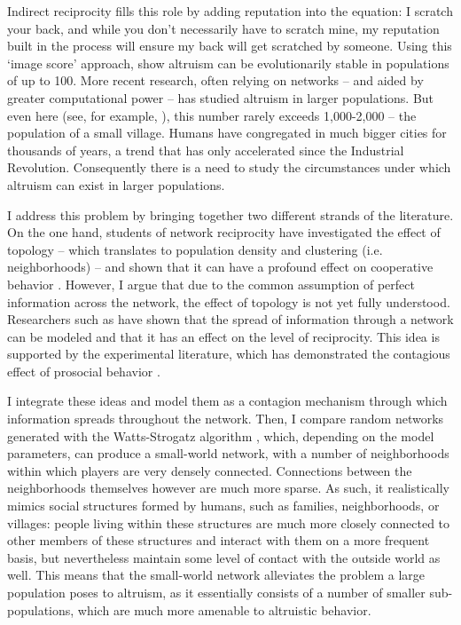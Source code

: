 \documentclass[12pt]{article}
\begin{document}
Indirect reciprocity fills this role by adding reputation into the equation: I scratch your back, and while you don't necessarily have to scratch mine, my reputation built in the process will ensure my back will get scratched by someone. Using this `image score' approach, \cite{Nowak1998} show altruism can be evolutionarily stable in populations of up to 100. More recent research, often relying on networks -- and aided by greater computational power -- has studied altruism in larger populations. But even here (see, for example, \cite{Peleteiro2014}), this number rarely exceeds 1,000-2,000 -- the population of a small village. Humans have congregated in much bigger cities for thousands of years, a trend that has only accelerated since the Industrial Revolution. Consequently there is a need to study the circumstances under which altruism can exist in larger populations. %

I address this problem by bringing together two different strands of the literature. On the one hand, students of network reciprocity have investigated the effect of topology -- which translates to population density and clustering (i.e. neighborhoods) -- and shown that it can have a profound effect on cooperative behavior \citep{Santos2008}. However, I argue that due to the common assumption of perfect information across the network, the effect of topology is not yet fully understood. Researchers such as \cite{Mohtashemi2003} have shown that the spread of information through a network can be modeled and that it has an effect on the level of reciprocity. This idea is supported by the experimental literature, which has demonstrated the contagious effect of prosocial behavior \citep{Tsvetkova2014, Kang2015, Ito2016}.

I integrate these ideas and model them as a contagion mechanism through which information spreads throughout the network. Then, I compare random networks generated with the  Watts-Strogatz algorithm \citep{Watts1998}, which, depending on the model parameters, can produce a small-world network, with a number of neighborhoods within which players are very densely connected. Connections between the neighborhoods themselves however are much more sparse. As such, it realistically mimics social structures formed by humans, such as families, neighborhoods, or villages: people living within these structures are much more closely connected to other members of these structures and interact with them on a more frequent basis, but nevertheless maintain some level of contact with the outside world as well. This means that the small-world network alleviates the problem a large population poses to altruism, as it essentially consists of a number of smaller sub-populations, which are much more amenable to altruistic behavior.
\end{document}
